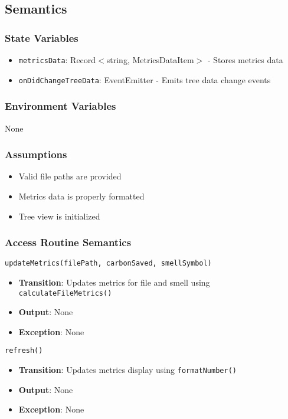 \documentclass[12pt, titlepage]{article}
\begin{document}
\subsection{Semantics}

\subsubsection{State Variables}
\begin{itemize}
\item \texttt{metricsData}: Record$<$string, MetricsDataItem$>$ - Stores metrics data
\item \texttt{onDidChangeTreeData}: EventEmitter - Emits tree data change events
\end{itemize}

\subsubsection{Environment Variables}
None

\subsubsection{Assumptions}
\begin{itemize}
\item Valid file paths are provided
\item Metrics data is properly formatted
\item Tree view is initialized
\end{itemize}

\subsubsection{Access Routine Semantics}
\texttt{updateMetrics(filePath, carbonSaved, smellSymbol)}
\begin{itemize}
\item \textbf{Transition}: Updates metrics for file and smell using \texttt{calculateFileMetrics()} 
\item \textbf{Output}: None
\item \textbf{Exception}: None
\end{itemize}

\texttt{refresh()}
\begin{itemize}
\item \textbf{Transition}: Updates metrics display using \texttt{formatNumber()}
\item \textbf{Output}: None
\item \textbf{Exception}: None
\end{itemize}
\end{document}
